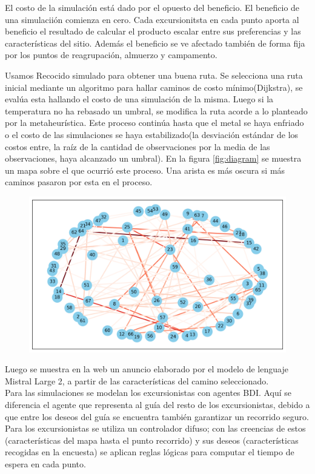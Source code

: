 \documentclass[10pt,twocolumn]{article}
\begin{document}
	 El costo de la simulaci\'on est\'a dado por el opuesto del beneficio. El beneficio de una simulacii\'on comienza en cero. Cada excursionitsta en cada punto aporta al beneficio el resultado de calcular el producto escalar entre sus preferencias y las caracter\'isticas del sitio. Adem\'as el beneficio se ve afectado tambi\'en de forma fija por los puntos de reagrupaci\'on, almuerzo y campamento. 
	 
	 Usamos Recocido simulado para obtener una buena ruta. Se selecciona una ruta inicial mediante un algoritmo para hallar caminos de costo m\'inimo(Dijkstra), se eval\'ua esta hallando el costo de una simulaci\'on de la misma. Luego si la temperatura no ha rebasado un umbral, se modifica la ruta acorde a lo planteado por la metaheur\'istica. Este proceso contin\'ua hasta que el metal se haya enfriado o el costo de las simulaciones se haya estabilizado(la desviaci\'on est\'andar de los costos entre, la ra\'iz de la cantidad de observaciones por la media de las observaciones, haya alcanzado un umbral). En la figura \ref{fig:diagram} se muestra un mapa sobre el que ocurri\'o este proceso. Una arista es m\'as oscura si m\'as caminos pasaron por esta en el proceso.
	 
		 \begin{figure}[h]
		 	\centering
		 	\includegraphics[width=\linewidth]{routes_stats.png}
		 	\caption{}
		 	\label{fig:routesstats}
		 \end{figure}
	
	 

	 
	 Luego se muestra en la web un anuncio elaborado por el modelo de lenguaje Mistral Large 2, a partir de las características del camino seleccionado.\\
	Para las simulaciones se modelan los excursionistas con agentes BDI. Aquí se diferencia el agente que representa al guía del resto de los excursionistas, debido a que entre los deseos del guía se encuentra también garantizar un recorrido seguro. Para los excursionistas se utiliza un controlador difuso; con las creencias de estos (características del mapa hasta el punto recorrido) y sus deseos (características recogidas en la encuesta) se aplican reglas l\'ogicas para computar el tiempo de espera en cada punto.
	
\end{document}
